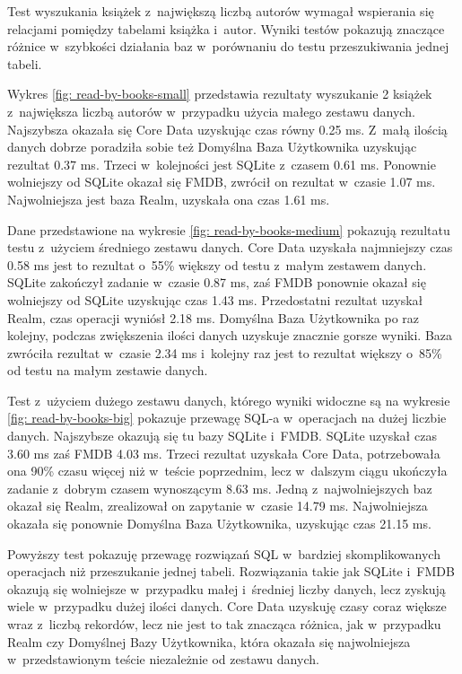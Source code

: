 Test wyszukania książek z~największą liczbą autorów wymagał wspierania się relacjami pomiędzy tabelami książka i~autor. Wyniki testów pokazują znaczące różnice w~szybkości działania baz w~porównaniu do testu przeszukiwania jednej tabeli. 

Wykres \ref{fig: read-by-books-small} przedstawia rezultaty wyszukanie 2 książek z~największa liczbą autorów w~przypadku użycia małego zestawu danych. Najszybsza okazała się Core Data uzyskując czas równy 0.25 ms. Z~małą ilością danych dobrze poradziła sobie też Domyślna Baza Użytkownika uzyskując rezultat 0.37 ms. Trzeci w~kolejności jest SQLite z~czasem 0.61 ms. Ponownie wolniejszy od SQLite okazał się FMDB, zwrócił on rezultat w~czasie 1.07 ms. Najwolniejsza jest baza Realm, uzyskała ona czas 1.61 ms.

Dane przedstawione na wykresie \ref{fig: read-by-books-medium} pokazują rezultatu testu z~użyciem średniego zestawu danych. Core Data uzyskała najmniejszy czas 0.58 ms jest to rezultat o~55\% większy od testu z~małym zestawem danych. SQLite zakończył zadanie w~czasie 0.87 ms, zaś FMDB ponownie okazał się wolniejszy od SQLite uzyskując czas 1.43 ms. Przedostatni rezultat uzyskał Realm, czas operacji wyniósł 2.18 ms. Domyślna Baza Użytkownika po raz kolejny, podczas zwiększenia ilości danych uzyskuje znacznie gorsze wyniki. Baza zwróciła rezultat w~czasie 2.34 ms i~kolejny raz jest to rezultat większy o~85\% od testu na małym zestawie danych. 

Test z~użyciem dużego zestawu danych, którego wyniki widoczne są na wykresie \ref{fig: read-by-books-big} pokazuje przewagę SQL-a w~operacjach na dużej liczbie danych. Najszybsze okazują się tu bazy SQLite i~FMDB. SQLite uzyskał czas 3.60 ms zaś FMDB 4.03 ms. Trzeci rezultat uzyskała Core Data, potrzebowała ona 90\% czasu więcej niż w~teście poprzednim, lecz w~dalszym ciągu ukończyła zadanie z~dobrym czasem wynoszącym 8.63 ms. Jedną z~najwolniejszych baz okazał się Realm, zrealizował on zapytanie w~czasie 14.79 ms. Najwolniejsza okazała się ponownie Domyślna Baza Użytkownika, uzyskując czas 21.15 ms. 

Powyższy test pokazuję przewagę rozwiązań SQL w~bardziej skomplikowanych operacjach niż przeszukanie jednej tabeli. Rozwiązania takie jak SQLite i~FMDB okazują się wolniejsze w~przypadku małej i~średniej liczby danych, lecz zyskują wiele w~przypadku dużej ilości danych. Core Data uzyskuję czasy coraz większe wraz z~liczbą rekordów, lecz nie jest to tak znacząca różnica, jak w~przypadku Realm czy Domyślnej Bazy Użytkownika, która okazała się najwolniejsza w~przedstawionym teście niezależnie od zestawu danych. 

